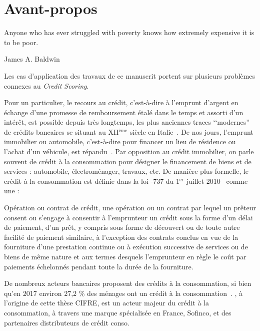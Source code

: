 \chapter*{\nmu Avant-propos} \label{chap_intro}

\epigraph{Anyone who has ever struggled with poverty knows how extremely expensive it is to be poor.}{James A. Baldwin}

Les cas d'application des travaux de ce manuscrit portent sur plusieurs problèmes connexes au \textit{Credit Scoring}.

Pour un particulier, le recours au crédit, c'est-à-dire à l'emprunt d'argent en échange d'une promesse de remboursement étalé dans le temps et assorti d'un intérêt, est possible depuis très longtemps, les plus anciennes traces ‘‘modernes'' de crédits bancaires se situant au XII$^\text{ème}$ siècle en Italie~\cite{thomas_wards_1828}. De nos jours, l'emprunt immobilier ou automobile, c'est-à-dire pour financer un lieu de résidence ou l'achat d'un véhicule, est répandu~\cite{la_tribune_2010}. Par opposition au crédit immobilier, on parle souvent de crédit à la consommation pour désigner le financement de biens et de services : automobile, électroménager, travaux, etc. De manière plus formelle, le crédit à la consommation est définie dans la loi -737 du 1$^\text{er}$ juillet 2010~\cite{noauthor_loi_2010} comme une :
\begin{displayquote}
Opération ou contrat de crédit, une opération ou un contrat par lequel un prêteur consent ou s’engage à consentir à l’emprunteur un crédit sous la forme d’un délai de paiement, d’un prêt, y compris sous forme de découvert ou de toute autre facilité de paiement similaire, à l’exception des contrats conclus en vue de la fourniture d’une prestation continue ou à exécution successive de services ou de biens de même nature et aux termes desquels l’emprunteur en règle le coût par paiements échelonnés pendant toute la durée de la fourniture.
\end{displayquote}

De nombreux acteurs bancaires proposent des crédits à la consommation, si bien qu'en 2017 environ 27,2 \% des ménages ont un crédit à la consommation~\cite{observatoire}. , à l'origine de cette thèse CIFRE, est un acteur majeur du crédit à la consommation, à travers une marque spécialisée en France, Sofinco, et des partenaires distributeurs de crédit conso.

